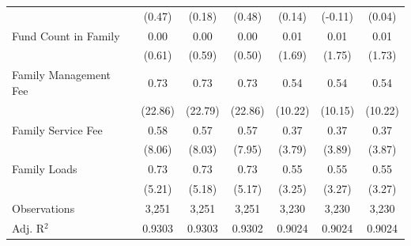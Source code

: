 {\begin{tabular}{l*{6}{c}}
                    &      (0.47)         &      (0.18)         &      (0.48)         &      (0.14)         &     (-0.11)         &      (0.04)         \\
\addlinespace
Fund Count in Family&        0.00         &        0.00         &        0.00         &        0.01\sym{*}  &        0.01\sym{*}  &        0.01\sym{*}  \\
                    &      (0.61)         &      (0.59)         &      (0.50)         &      (1.69)         &      (1.75)         &      (1.73)         \\
\addlinespace
Family Management Fee&        0.73\sym{***}&        0.73\sym{***}&        0.73\sym{***}&        0.54\sym{***}&        0.54\sym{***}&        0.54\sym{***}\\
                    &     (22.86)         &     (22.79)         &     (22.86)         &     (10.22)         &     (10.15)         &     (10.22)         \\
\addlinespace
Family Service Fee  &        0.58\sym{***}&        0.57\sym{***}&        0.57\sym{***}&        0.37\sym{***}&        0.37\sym{***}&        0.37\sym{***}\\
                    &      (8.06)         &      (8.03)         &      (7.95)         &      (3.79)         &      (3.89)         &      (3.87)         \\
\addlinespace
Family Loads        &        0.73\sym{***}&        0.73\sym{***}&        0.73\sym{***}&        0.55\sym{***}&        0.55\sym{***}&        0.55\sym{***}\\
                    &      (5.21)         &      (5.18)         &      (5.17)         &      (3.25)         &      (3.27)         &      (3.27)         \\
\midrule
Observations        &       3,251         &       3,251         &       3,251         &       3,230         &       3,230         &       3,230         \\
Adj. R$^{2}$        &      0.9303         &      0.9303         &      0.9302         &      0.9024         &      0.9024         &      0.9024         \\
\bottomrule
\end{tabular}
}
